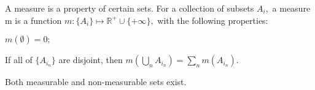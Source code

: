 A measure is a property of certain sets. For a collection of subsets $A_{i},$  a measure m is a function $ m : \{ A_i \} \mapsto \mathbb{R}^{+} \cup
\{ + \infty \} , $ with the following properties:
\par
$ m ( \emptyset ) = 0 ; $
\par
If all of $\{  A_{i_{n}} \} $ are disjoint, then 
$ m \left ( \bigcup _n A_{i_{n}} \right ) = \sum _n m ( A_{i_{n}} ) . $
\par
Both measurable and non-measurable sets exist.